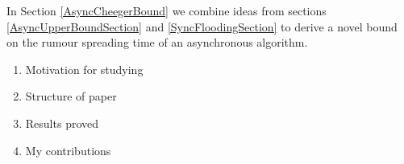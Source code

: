In Section \ref{AsyncCheegerBound} we combine ideas from sections \ref{AsyncUpperBoundSection} and \ref{SyncFloodingSection} to derive a novel bound on the rumour spreading time of an asynchronous algorithm. 


\begin{enumerate}
	\item Motivation for studying
	\item Structure of paper
	\item Results proved
	\item My contributions
\end{enumerate}